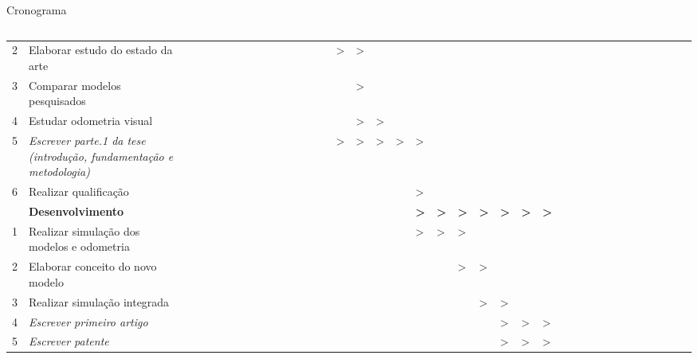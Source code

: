 \begin{frame}[c]{Cronograma}
\begin{columns}
\begin{table}[]
\begin{tabular}{llllllllllllll|llllllllllll|llllllllllll}
    2 & Elaborar estudo do estado da arte &  &  &  &  &  &  &  &  &  &  &  &  &  & \textgreater{} & \textgreater{} &  &  &  &  &  &  &  &  &  &  &  &  &  &  &  &  &  &  &  &  &  \\
    3 & Comparar modelos pesquisados &  &  &  &  &  &  &  &  &  &  &  &  &  &  & \textgreater{} &  &  &  &  &  &  &  &  &  &  &  &  &  &  &  &  &  &  &  &  &  \\
    4 & Estudar odometria visual &  &  &  &  &  &  &  &  &  &  &  &  &  &  & \textgreater{} & \textgreater{} &  &  &  &  &  &  &  &  &  &  &  &  &  &  &  &  &  &  &  &  \\
    5 & {\color[HTML]{3166FF} \textit{Escrever parte.1 da tese (introdução, fundamentação e metodologia)}} &  &  &  &  &  &  &  &  &  &  &  &  &  & \textgreater{} & \textgreater{} & \textgreater{} & \textgreater{} & \textgreater{} &  &  &  &  &  &  &  &  &  &  &  &  &  &  &  &  &  &  \\
    6 & {\color[HTML]{9A0000} Realizar qualificação} &  &  &  &  &  &  &  &  &  &  &  &  &  &  &  &  &  & \textgreater{} &  &  &  &  &  &  &  &  &  &  &  &  &  &  &  &  &  &  \\ \hline
     & \textbf{Desenvolvimento} &  &  &  &  &  &  &  &  &  &  &  &  &  &  &  &  &  & \textbf{\textgreater{}} & \textbf{\textgreater{}} & \textbf{\textgreater{}} & \textbf{\textgreater{}} & \textbf{\textgreater{}} & \textbf{\textgreater{}} & \textbf{\textgreater{}} &  &  &  &  &  &  &  &  &  &  &  &  \\ \hline
    1 & Realizar simulação dos modelos e odometria &  &  &  &  &  &  &  &  &  &  &  &  &  &  &  &  &  & \textgreater{} & \textgreater{} & \textgreater{} &  &  &  &  &  &  &  &  &  &  &  &  &  &  &  &  \\
    2 & Elaborar conceito do novo modelo &  &  &  &  &  &  &  &  &  &  &  &  &  &  &  &  &  &  &  & \textgreater{} & \textgreater{} &  &  &  &  &  &  &  &  &  &  &  &  &  &  &  \\
    3 & Realizar simulação integrada &  &  &  &  &  &  &  &  &  &  &  &  &  &  &  &  &  &  &  &  & \textgreater{} & \textgreater{} &  &  &  &  &  &  &  &  &  &  &  &  &  &  \\
    4 & {\color[HTML]{3166FF} \textit{Escrever primeiro artigo}} &  &  &  &  &  &  &  &  &  &  &  &  &  &  &  &  &  &  &  &  &  & \textgreater{} & \textgreater{} & \textgreater{} &  &  &  &  &  &  &  &  &  &  &  &  \\
    5 & {\color[HTML]{3166FF} \textit{Escrever patente}} &  &  &  &  &  &  &  &  &  &  &  &  &  &  &  &  &  &  &  &  &  & \textgreater{} & \textgreater{} & \textgreater{} &  &  &  &  &  &  &  &  &  &  &  &  \\ \hline

\end{tabular}
\end{table}
\end{columns}
\end{frame}
